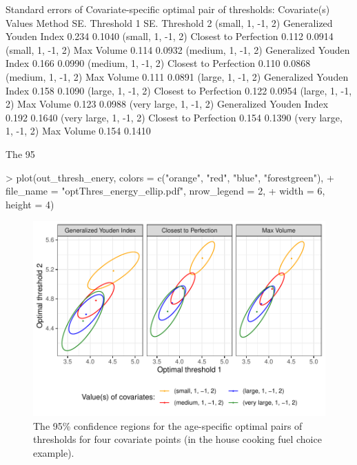 \begin{example}
Standard errors of Covariate-specific optimal pair of thresholds: 
    Covariate(s) Values                   Method SE. Threshold 1 SE. Threshold 2
      (small, 1, -1, 2) Generalized Youden Index           0.234          0.1040
      (small, 1, -1, 2)    Closest to Perfection           0.112          0.0914
      (small, 1, -1, 2)               Max Volume           0.114          0.0932
     (medium, 1, -1, 2) Generalized Youden Index           0.166          0.0990
     (medium, 1, -1, 2)    Closest to Perfection           0.110          0.0868
     (medium, 1, -1, 2)               Max Volume           0.111          0.0891
      (large, 1, -1, 2) Generalized Youden Index           0.158          0.1090
      (large, 1, -1, 2)    Closest to Perfection           0.122          0.0954
      (large, 1, -1, 2)               Max Volume           0.123          0.0988
 (very large, 1, -1, 2) Generalized Youden Index           0.192          0.1640
 (very large, 1, -1, 2)    Closest to Perfection           0.154          0.1390
 (very large, 1, -1, 2)               Max Volume           0.154          0.1410
\end{example}
The 95%
\begin{example}
> plot(out_thresh_enery, colors = c("orange", "red", "blue", "forestgreen"), 
+      file_name = "optThres_energy_ellip.pdf", nrow_legend = 2, 
+      width = 6, height = 4)
\end{example}

\begin{figure}[htbp]
\centering
\includegraphics[width=0.8\linewidth]{optThres_energy_ellip.pdf} 
\caption{The 95\% confidence regions for the age-specific optimal pairs of thresholds for four covariate points (in the house cooking fuel choice example).}
\label{fig:optThresh-energy}
\end{figure}


